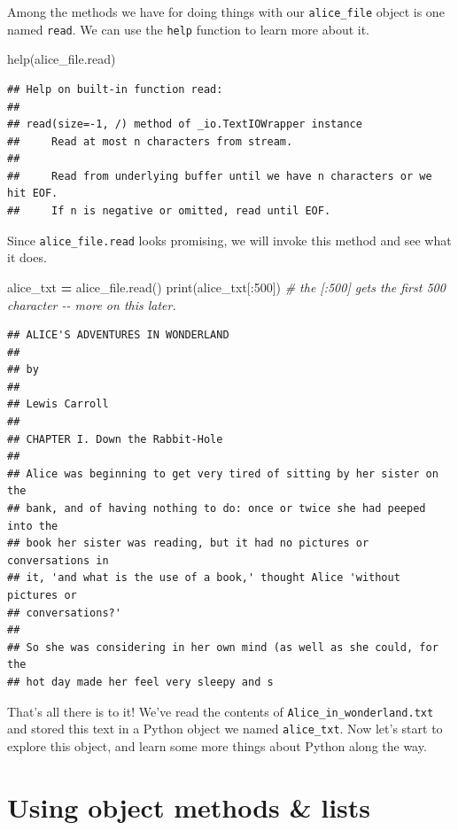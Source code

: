 \documentclass[
]{book}
\newenvironment{Shaded}{\begin{snugshade}}{\end{snugshade}}
\newcommand{\BuiltInTok}[1]{#1}
\newcommand{\CommentTok}[1]{\textcolor[rgb]{0.56,0.35,0.01}{\textit{#1}}}
\newcommand{\DecValTok}[1]{\textcolor[rgb]{0.00,0.00,0.81}{#1}}
\newcommand{\NormalTok}[1]{#1}
\newcommand{\OperatorTok}[1]{\textcolor[rgb]{0.81,0.36,0.00}{\textbf{#1}}}
\begin{document}
Among the methods we have for doing things with our \texttt{alice\_file} object is one named \texttt{read}. We can use the \texttt{help} function to learn more about it.

\begin{Shaded}
\begin{Highlighting}[]
\BuiltInTok{help}\NormalTok{(alice\_file.read)}
\end{Highlighting}
\end{Shaded}

\begin{verbatim}
## Help on built-in function read:
## 
## read(size=-1, /) method of _io.TextIOWrapper instance
##     Read at most n characters from stream.
##     
##     Read from underlying buffer until we have n characters or we hit EOF.
##     If n is negative or omitted, read until EOF.
\end{verbatim}

Since \texttt{alice\_file.read} looks promising, we will invoke this method and see what it does.

\begin{Shaded}
\begin{Highlighting}[]
\NormalTok{alice\_txt }\OperatorTok{=}\NormalTok{ alice\_file.read()}
\BuiltInTok{print}\NormalTok{(alice\_txt[:}\DecValTok{500}\NormalTok{]) }\CommentTok{\# the [:500] gets the first 500 character {-}{-} more on this later.}
\end{Highlighting}
\end{Shaded}

\begin{verbatim}
## ﻿ALICE'S ADVENTURES IN WONDERLAND
## 
## by
## 
## Lewis Carroll
## 
## CHAPTER I. Down the Rabbit-Hole
## 
## Alice was beginning to get very tired of sitting by her sister on the
## bank, and of having nothing to do: once or twice she had peeped into the
## book her sister was reading, but it had no pictures or conversations in
## it, 'and what is the use of a book,' thought Alice 'without pictures or
## conversations?'
## 
## So she was considering in her own mind (as well as she could, for the
## hot day made her feel very sleepy and s
\end{verbatim}

That's all there is to it! We've read the contents of \texttt{Alice\_in\_wonderland.txt} and stored this text in a Python object we named \texttt{alice\_txt}. Now let's start to explore this object, and learn some more things about Python along the way.

\hypertarget{using-object-methods-lists}{%
\section{Using object methods \& lists}\label{using-object-methods-lists}}
\end{document}
